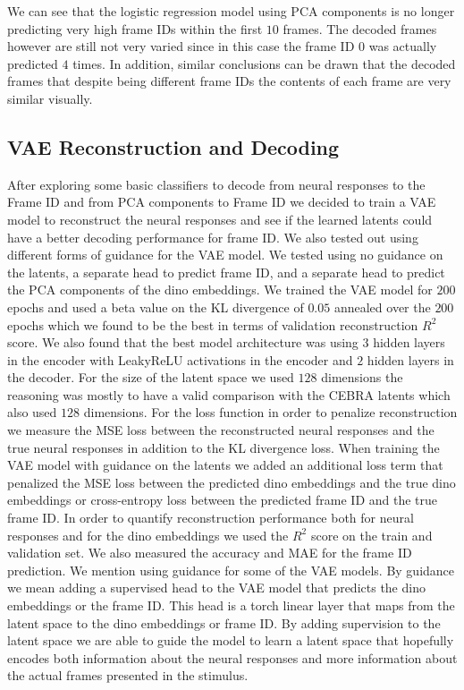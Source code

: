 \documentclass[12pt, letterpaper]{article}
\begin{document}
We can see that the logistic regression model using PCA components is no longer predicting very high frame IDs within the first $10$ frames. The decoded frames however are still not very varied since in this case the frame ID $0$ was actually predicted $4$ times. In addition, similar conclusions can be drawn that the decoded frames that despite being different frame IDs the contents of each frame are very similar visually.

\subsection{VAE Reconstruction and Decoding}
\label{subsec:vae_reconstruction_and_decoding}
After exploring some basic classifiers to decode from neural responses to the Frame ID and from PCA components to Frame ID we decided to train a VAE model to reconstruct the neural responses and see if the learned latents could have a better decoding performance for frame ID. We also tested out using different forms of guidance for the VAE model. We tested using no guidance on the latents, a separate head to predict frame ID, and a separate head to predict the PCA components of the dino embeddings. We trained the VAE model for $200$ epochs and used a beta value on the KL divergence of $0.05$ annealed over the $200$ epochs which we found to be the best in terms of validation reconstruction $R^2$ score. We also found that the best model architecture was using $3$ hidden layers in the encoder with LeakyReLU activations in the encoder and $2$ hidden layers in the decoder. 
For the size of the latent space we used $128$ dimensions the reasoning was mostly to have a valid comparison with the CEBRA latents which also used $128$ dimensions. For the loss function in order to penalize reconstruction we measure the MSE loss between the reconstructed neural responses and the true neural responses in addition to the KL divergence loss. When training the VAE model with guidance on the latents we added an additional loss term that penalized the MSE loss between the predicted dino embeddings and the true dino embeddings or cross-entropy loss between the predicted frame ID and the true frame ID. In order to quantify reconstruction performance both for neural responses and for the dino embeddings we used the $R^2$ score on the train and validation set. We also measured the accuracy and MAE for the frame ID prediction.
We mention using guidance for some of the VAE models. By guidance we mean adding a supervised head to the VAE model that predicts the dino embeddings or the frame ID. This head is a torch linear layer that maps from the latent space to the dino embeddings or frame ID. By adding supervision to the latent space we are able to guide the model to learn a latent space that hopefully encodes both information about the neural responses and more information about the actual frames presented in the stimulus.
\end{document}

